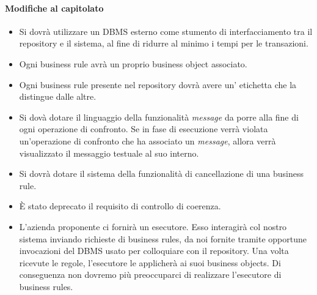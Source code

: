 \documentclass[11pt,titlepage,a4paper]{report}
\begin{document}
\paragraph{Modifiche al capitolato}

\begin{itemize}

\item Si dovr\`a utilizzare un DBMS esterno come stumento di interfacciamento tra il repository e il sistema, al fine di ridurre al minimo i tempi per le transazioni.

\item Ogni business rule avr\`a un proprio business object associato.

\item Ogni business rule presente nel repository dovr\`a avere un' etichetta che la distingue dalle altre.

\item Si dov\`a dotare il linguaggio della funzionalit\`a \textit{message} da porre alla fine di ogni operazione di confronto. Se in fase di esecuzione verr\`a violata un'operazione di confronto che ha associato un \textit{message}, allora verr\`a visualizzato il messaggio testuale al suo interno.

\item Si dovr\`a dotare il sistema della funzionalit\`a di cancellazione di una business rule.

\item \`E stato deprecato il requisito di controllo di coerenza.

\item L'azienda proponente ci fornir\`a un esecutore. Esso interagir\`a col nostro sistema inviando richieste di business rules, da noi fornite tramite opportune invocazioni del DBMS usato per colloquiare con il repository. Una volta ricevute le regole, l'esecutore le applicher\`a ai suoi business objects. Di conseguenza non dovremo pi\`u preoccuparci di realizzare l'esecutore di business rules.
\end{itemize}
\end{document}
